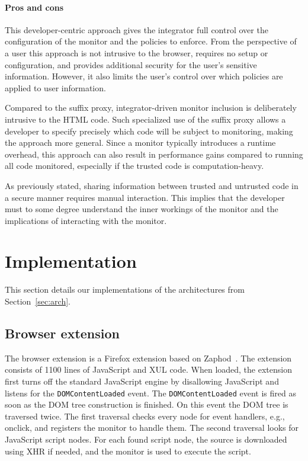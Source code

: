 \documentclass{llncs}
\newcommand{\todo}[1]{\colorbox{red}{\textcolor{white}{\sffamily\bfseries\scriptsize TODO}} \textcolor{red}{#1} \textcolor{red}{$\blacktriangleleft$}}
\begin{document}
\paragraph{Pros and cons}

This developer-centric approach gives the integrator full control over the 
configuration of the monitor and the policies to enforce. From the perspective of a user this 
approach is not intrusive to the browser, requires no setup or configuration, 
and provides additional security for the user's sensitive information. However, 
it also limits the user's control over which policies are applied to user information. 

Compared to the suffix proxy, integrator-driven monitor 
inclusion is deliberately intrusive to the HTML code. Such specialized use of the suffix 
proxy allows a developer to specify precisely which code will be subject to 
monitoring, making the approach more general. 
Since a monitor typically introduces a runtime overhead, this approach can also 
result in performance gains compared to running all code monitored, especially 
if the trusted code is computation-heavy.

As previously stated, sharing information 
between trusted and untrusted code in a secure manner requires manual interaction. 
This implies that the developer must to some degree understand the inner workings of the monitor
and the implications of interacting with the monitor.


\section{Implementation}
\label{sec:impl}

This section details our implementations of the architectures
from Section~\ref{sec:arch}. 


\subsection{Browser extension}

The browser extension is a Firefox extension based on Zaphod~\cite{Zaphod}.
The extension consists of 1100 lines of JavaScript and XUL code.
When loaded, the extension first turns off the standard JavaScript engine by
disallowing JavaScript and listens for the \lstinline{DOMContentLoaded} event.  The
\lstinline{DOMContentLoaded} event is fired as soon as the DOM tree construction is
finished.  On this event the DOM tree is traversed twice. The first traversal
checks every node for event handlers, e.g., onclick, and registers the monitor
to handle them. The second traversal looks for JavaScript script nodes.  For
each found script node, the source is downloaded using XHR if needed, and the
monitor is used to execute the script.
\end{document}
